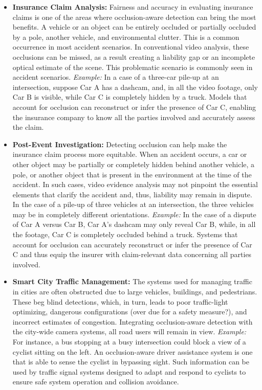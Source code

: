 \documentclass[12pt,a4paper]{report}
\theoremstyle{definition}
\theoremstyle{remark}
\begin{document}
\begin{itemize}
    \item \textbf{Insurance Claim Analysis:} 
    Fairness and accuracy in evaluating insurance claims is one of the areas where occlusion-aware detection can bring the most benefits. A vehicle or an object can be entirely occluded or partially occluded by a pole, another vehicle, and environmental clutter. This is a common occurrence in most accident scenarios. In conventional video analysis, these occlusions can be missed, as a result creating a liability gap or an incomplete optical estimate of the scene. This problematic scenario is commonly seen in accident scenarios.
    \textit{Example:} In a case of a three-car pile-up at an intersection, suppose Car A has a dashcam, and, in all the video footage, only Car B is visible, while Car C is completely hidden by a truck. Models that account for occlusion can reconstruct or infer the presence of Car C, enabling the insurance company to know all the parties involved and accurately assess the claim.

    \item \textbf{Post-Event Investigation:} 
    Detecting occlusion can help make the insurance claim process more equitable. When an accident occurs, a car or other object may be partially or completely hidden behind another vehicle, a pole, or another object that is present in the environment at the time of the accident. In such cases, video evidence analysis may not pinpoint the essential elements that clarify the accident and, thus, liability may remain in dispute.
In the case of a pile-up of three vehicles at an intersection, the three vehicles may be in completely different orientations. 
    \textit{Example:} In the case of a dispute of Car A versus Car B, Car A’s dashcam may only reveal Car B, while, in all the footage, Car C is completely occluded behind a truck. Systems that account for occlusion can accurately reconstruct or infer the presence of Car C and thus equip the insurer with claim-relevant data concerning all parties involved.

    \item \textbf{Smart City Traffic Management:} 
    The systems used for managing traffic in cities are often obstructed due to large vehicles, buildings, and pedestrians. These beg blind detections, which, in turn, leads to poor traffic-light optimizing, dangerous configurations (over due for a safety measure?), and incorrect estimates of congestion. Integrating occlusion-aware detection with the city-wide camera systems, all road users will remain in view.
\textit{Example:} For instance, a bus stopping at a busy intersection could block a view of a cyclist sitting on the left. An occlusion-aware driver assistance system is one that is able to sense the cyclist in bypassing sight. Such information can be used by traffic signal systems designed to adapt and respond to cyclists to ensure safe system operation and collision avoidance.


\end{itemize}
\end{document}
